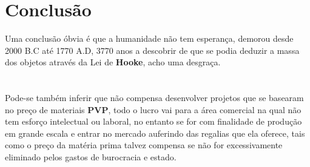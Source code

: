 \chapter{Conclusão}
Uma conclusão óbvia é que a humanidade não tem esperança, demorou desde 2000 B.C até 1770 A.D, 3770 anos a descobrir de que se podia deduzir a massa dos objetos através da Lei de \textbf{Hooke}, acho uma desgraça. \\
\\
\\
Pode-se também inferir que não compensa desenvolver projetos que se basearam no preço de materiais \textbf{PVP}, todo o lucro vai para a área comercial na qual não tem esforço intelectual ou laboral, no entanto se for com finalidade de produção em grande escala e entrar no mercado auferindo das regalias que ela oferece, tais como o preço da matéria prima talvez compensa se não for excessivamente eliminado pelos gastos de burocracia e estado. \\
\\
\\
